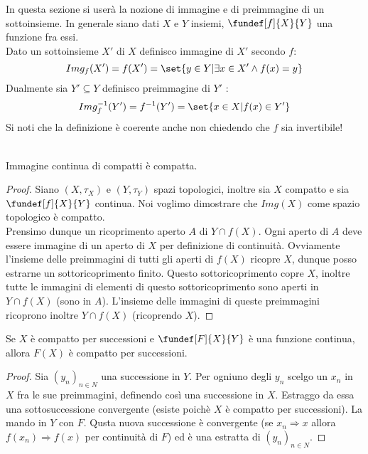 

In questa sezione si userà la nozione di immagine e di preimmagine di un sottoinsieme. In generale siano dati $X$ e $Y$ insiemi, $\fundef[f]{X}{Y}$ una funzione fra essi.\\
Dato un sottoinsieme $X'$ di $X$ definisco immagine di $X'$ secondo $f$: 
\begin{equation*}
Img_f(X') = f(X') =\set{y \in Y | \exists x \in X' \wedge f(x) = y} 
\end{equation*}
Dualmente sia $Y'\subseteq Y$ definisco preimmagine di $Y'$ :
\begin{equation*}
Img_f^{-1}(Y')=f^{-1}(Y')=\set{x\in X | f(x)\in Y'}
\end{equation*}
Si noti che la definizione è coerente anche non chiedendo che $f$ sia invertibile!
\\
\\
\begin{lemma}
Immagine continua di compatti è compatta.
\end{lemma}

\begin{proof}
Siano $(X, \tau_X)$ e $(Y, \tau_Y)$ spazi topologici, inoltre sia $X$ compatto e sia $\fundef[f]{X}{Y}$ continua. Noi voglimo dimostrare che $Img(X)$ come spazio topologico è compatto.\\ 
Prensimo dunque un ricoprimento aperto $A$ di $Y\cap f(X)$. Ogni aperto di $A$ deve essere immagine di un aperto di $X$ per definizione di continuità. Ovviamente l'insieme delle preimmagini di tutti gli aperti di $f(X)$ ricopre $X$, dunque posso estrarne un sottoricoprimento finito. Questo sottoricoprimento copre $X$, inoltre tutte le immagini di elementi di questo sottoricoprimento sono aperti in $Y\cap f(X)$ (sono in $A$). L'insieme delle immagini di queste preimmagini ricoprono inoltre $Y\cap f(X)$ (ricoprendo $X$).
\end{proof}

\begin{lemma}
Se $X$ è compatto per successioni e $\fundef[F]{X}{Y}$ è una funzione continua, allora $F(X)$ è compatto per successioni.
\end{lemma}
\begin{proof}
Sia $(y_n)_{n\in N}$ una successione in $Y$. Per ogniuno degli $y_n$ scelgo un $x_n$ in $X$ fra le sue preimmagini, definendo così una successione in $X$. Estraggo da essa una sottosuccessione convergente (esiste poichè $X$ è compatto per successioni). La mando in $Y$ con $F$. Qusta nuova successione è convergente (se $x_n \Rightarrow x$ allora $f(x_n)\Rightarrow f(x)$ per continuità di $F$) ed è una estratta di   $(y_n)_{n\in N}$.
\end{proof}

